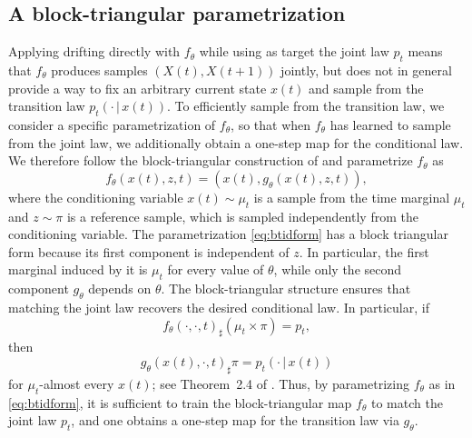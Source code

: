 \documentclass[oneside,11pt]{article}
\theoremstyle{remark}
\begin{document}
\subsection{A block-triangular parametrization}
Applying drifting directly with $f_{\theta}$ while using as target the joint law $p_t$ means that  $f_{\theta}$ produces samples $(X(t),X(t+1))$ jointly, but does not in
    general provide a way to fix an arbitrary current state $x(t)$ and sample
    from the transition law $p_t(\cdot\,|\,x(t))$.
To efficiently sample from the transition law, we consider a specific parametrization of $f_{\theta}$, so that when $f_{\theta}$ has learned to sample from the joint law, we additionally obtain a one-step map for the conditional law.
We therefore follow the block-triangular construction of
\cite{baptista2024conditional} and parametrize $f_{\theta}$ as
    \begin{equation}\label{eq:btidform}
        f_\theta(x(t),z,t)
        =
        \left(
        x(t),
        g_\theta(x(t),z,t)
        \right),
    \end{equation}
    where the conditioning variable $x(t)\sim\mu_t$ is a sample from the time marginal $\mu_t$ and $z\sim\pi$ is a reference sample, which is sampled independently from the conditioning variable.
The parametrization \eqref{eq:btidform}  has a  block triangular form because its first component is independent of $z$. In particular, the first marginal induced by it is $\mu_t$ for every value of $\theta$, while only the second component
    $g_\theta$ depends on $\theta$.
The block-triangular structure ensures that matching the joint law recovers the desired conditional law. In particular,
    if
    \[
        f_\theta(\cdot,\cdot,t)_{\sharp}(\mu_t\times\pi)
        =
        p_t,
    \]
    then
    \[
        g_\theta(x(t),\cdot,t)_{\sharp}\pi
        =
        p_t(\cdot\,|\,x(t))
    \]
    for $\mu_t$-almost every $x(t)$; see Theorem~2.4 of
    \cite{baptista2024conditional}.
Thus, by parametrizing $f_{\theta}$ as in  \eqref{eq:btidform}, it is
    sufficient to train the block-triangular map $f_\theta$ to match the joint
    law $p_t$, and one obtains a one-step map for the transition law via $g_{\theta}$.
\end{document}
